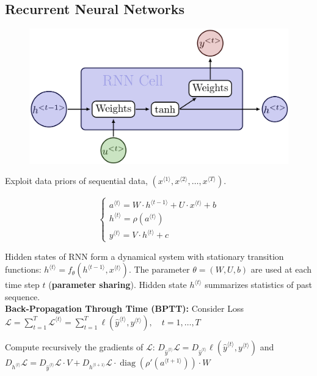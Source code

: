 \documentclass[a4paper,10pt]{article}
\begin{document}
\begin{small}
\section{Recurrent Neural Networks}

\begin{figure}
    \centering
    \vspace{-25pt}
    \includegraphics[width=0.5\columnwidth]{figures/RNN_cell.png}
    \vspace{-20pt}
\end{figure}

Exploit data priors of sequential data, $(x^{\langle 1 \rangle}, x^{\langle 2 \rangle}, \dots, x^{\langle T \rangle})$.

$$
\begin{cases}
a^{\langle t \rangle} = W \cdot h^{\langle t-1 \rangle} + U \cdot x^{\langle t \rangle} + b \\
h^{\langle t \rangle} = \rho(a^{\langle t \rangle}) \\
y^{\langle t \rangle} = V \cdot h^{\langle t \rangle} + c
\end{cases}
$$

Hidden states of RNN form a dynamical system with stationary
transition functions: $h^{\langle t \rangle} = f_{\theta}\left(h^{\langle t-1 \rangle}, x^{\langle t \rangle}\right)$. The parameter $\theta = (W, U, b)$ are used at each time step $t$ (\textbf{parameter sharing}). Hidden state $h^{\langle t \rangle}$ summarizes statistics of past sequence. \\

\textbf{Back-Propagation Through Time (BPTT):} Consider Loss $\mathcal{L} = \sum_{t=1}^{T} \mathcal{L}^{\langle t \rangle} = \sum_{t=1}^{T} \ell(\hat{y}^{\langle t \rangle}, y^{\langle t \rangle}), \quad t = 1, \dots, T$

Compute recursively the gradients of $\mathcal{L}$:
$
D_{\hat{y}^{\langle t \rangle}} \mathcal{L} = D_{\hat{y}^{\langle t \rangle}} \ell(\hat{y}^{\langle t \rangle}, y^{\langle t \rangle})
$ and
$
D_{h^{\langle t \rangle}} \mathcal{L} = D_{\hat{y}^{\langle t \rangle}} \mathcal{L} \cdot V + D_{h^{\langle t+1 \rangle}} \mathcal{L} \cdot \operatorname{diag}\left( \rho'\left(a^{\langle t+1 \rangle}\right) \right) \cdot W
$


\end{small}
\end{document}
